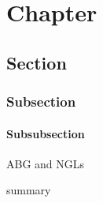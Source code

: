 
\chapter{Chapter}
\section{Section}
\subsection{Subsection}
\subsubsection{Subsubsection}
 
\gls{ABG} and \glspl{NGL}

\vfill
{}

summary